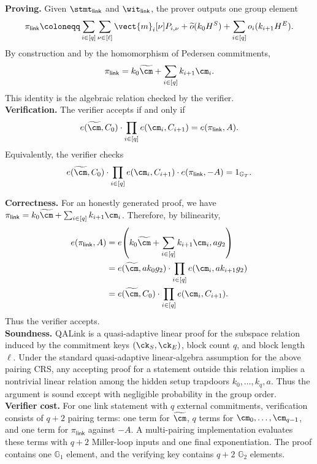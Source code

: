 \noindent\textbf{Proving.}
Given \(\stmt_{\mathsf{link}}\) and \(\wit_{\mathsf{link}}\), the prover
outputs one group element
\[
\begin{aligned}
  \pi_{\mathsf{link}}
  \coloneqq
  \sum_{i\in[q]}\sum_{\nu\in[\ell]}
  \vect{m}_i[\nu]P_{i,\nu}
  +
  \widetilde{o}(k_0H^S)
  +
  \sum_{i\in[q]} o_i(k_{i+1}H^E).
\end{aligned}
\]
By construction and by the homomorphism of Pedersen commitments,
\[
  \pi_{\mathsf{link}}
  =
  k_0\widetilde{\cm}
  +
  \sum_{i\in[q]} k_{i+1}\cm_i .
\]
This identity is the algebraic relation checked by the verifier. \\

\noindent\textbf{Verification.}
The verifier accepts if and only if
\[
  e(\widetilde{\cm},C_0)
  \cdot
  \prod_{i\in[q]} e(\cm_i,C_{i+1})
  =
  e(\pi_{\mathsf{link}},A).
\]
Equivalently, the verifier checks
\[
  e(\widetilde{\cm},C_0)
  \cdot
  \prod_{i\in[q]} e(\cm_i,C_{i+1})
  \cdot
  e(\pi_{\mathsf{link}},-A)
  =
  1_{\mathbb{G}_T}.
\]

\noindent\textbf{Correctness.}
For an honestly generated proof, we have
\(\pi_{\mathsf{link}}=k_0\widetilde{\cm}+\sum_{i\in[q]}k_{i+1}\cm_i\).
Therefore, by bilinearity,
\[
\begin{aligned}
  e(\pi_{\mathsf{link}},A)
  &=
  e\!\left(k_0\widetilde{\cm}+\sum_{i\in[q]}k_{i+1}\cm_i,ag_2\right)
  \\
  &=
  e(\widetilde{\cm},ak_0g_2)
  \cdot
  \prod_{i\in[q]} e(\cm_i,ak_{i+1}g_2)
  \\
  &=
  e(\widetilde{\cm},C_0)
  \cdot
  \prod_{i\in[q]} e(\cm_i,C_{i+1}).
\end{aligned}
\]
Thus the verifier accepts. \\

\noindent\textbf{Soundness.}
QALink is a quasi-adaptive linear proof for the subspace relation induced by
the commitment keys \((\ck_S,\ck_E)\), block count \(q\), and block length
\(\ell\).  Under the standard quasi-adaptive linear-algebra assumption for the
above pairing CRS, any accepting proof for a statement outside this relation
implies a nontrivial linear relation among the hidden setup trapdoors
\(k_0,\ldots,k_q,a\).  Thus the argument is sound except with negligible
probability in the group order. \\

\noindent\textbf{Verifier cost.}
For one link statement with \(q\) external commitments, verification consists
of \(q+2\) pairing terms:
one term for \(\widetilde{\cm}\), \(q\) terms for
\(\cm_0,\ldots,\cm_{q-1}\), and one term for \(\pi_{\mathsf{link}}\) against
\(-A\).  A multi-pairing implementation evaluates these terms with \(q+2\)
Miller-loop inputs and one final exponentiation.  The proof contains one
\(\mathbb{G}_1\) element, and the verifying key contains \(q+2\)
\(\mathbb{G}_2\) elements. \\

